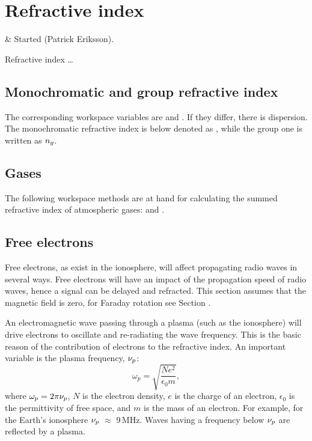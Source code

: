 \chapter{Refractive index}
 \label{sec:rindex}

 & Started (Patrick Eriksson).\\
\stophistory


Refractive index \dots



\section{Monochromatic and group refractive index}
%
The corresponding workspace variables are  and
. If they differ, there is
dispersion. The monochromatic refractive index is below
denoted as \Rfr, while the group one is written as $n_{g}$.




\section{Gases}
%
The following workspace methods are at hand for calculating the summed
refractive index of atmospheric gases:  and
.  


\section{Free electrons}
%
Free electrons, as exist in the ionosphere, will affect propagating radio waves
in several ways. Free electrons will have an impact of the propagation speed of
radio waves, hence a signal can be delayed and refracted. This section assumes
that the magnetic field is zero, for Faraday rotation see Section .

An electromagnetic wave passing through a plasma (such as the ionosphere) will
drive electrons to oscillate and re-radiating the wave frequency. This is the
basic reason of the contribution of electrons to the refractive index. 
An important variable is the plasma frequency, $\nu_{p}$:
\begin{equation}
  \omega_{p}=\sqrt{\frac{Ne^{2}}{\epsilon_{0}m}},
\end{equation}
where \(\omega_{p}=2\pi\nu_{p}\), \(N\) is the electron density, \(e\) is the
charge of an electron, \(\epsilon_{0}\) is the permittivity of free space, and
\(m\) is the mass of an electron. For example, for the Earth's ionosphere
\(\nu_{p}\) \(\approx\) 9\,MHz.
Waves having a frequency below $\nu_{p}$ are reflected by a plasma.

